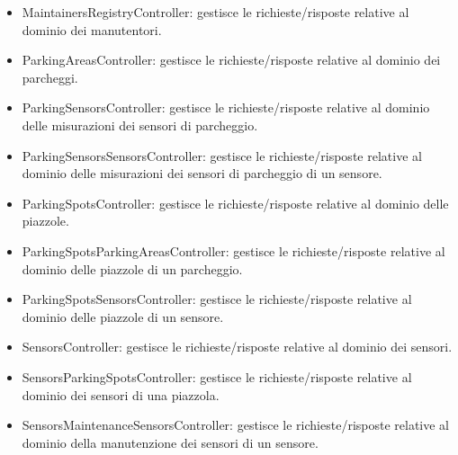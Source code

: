 \begin{itemize}
    \item MaintainersRegistryController: gestisce le richieste/risposte relative al dominio dei manutentori.
    \item ParkingAreasController: gestisce le richieste/risposte relative al dominio dei parcheggi.
    \item ParkingSensorsController: gestisce le richieste/risposte relative al dominio delle misurazioni
    dei sensori di parcheggio.
    \item ParkingSensorsSensorsController: gestisce le richieste/risposte relative al dominio delle misurazioni
    dei sensori di parcheggio di un sensore.
    \item ParkingSpotsController: gestisce le richieste/risposte relative al dominio delle piazzole.
    \item ParkingSpotsParkingAreasController: gestisce le richieste/risposte relative al dominio delle piazzole
    di un parcheggio.
    \item ParkingSpotsSensorsController: gestisce le richieste/risposte relative al dominio delle piazzole
    di un sensore.
    \item SensorsController: gestisce le richieste/risposte relative al dominio dei sensori.
    \item SensorsParkingSpotsController: gestisce le richieste/risposte relative al dominio dei sensori di una
    piazzola.
    \item SensorsMaintenanceSensorsController: gestisce le richieste/risposte relative al dominio della manutenzione dei
    sensori di un sensore.
\end{itemize}

